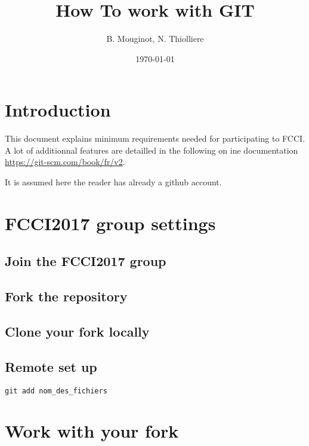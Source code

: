 \documentclass[a4paper,11pt]{article}
\title{How To work with GIT}
\date{\today}
\author{B. Mouginot, N. Thiolliere}
\begin{document}
\maketitle
{}

\tableofcontents

\section{Introduction}

	This document explains minimum requirements needed for participating to FCCI. A lot of additionnal features are detailled in the following on ine documentation \url{https://git-scm.com/book/fr/v2}.

	It is assumed here the reader has already a github account.

\section{FCCI2017 group settings}

	\subsection{Join the FCCI2017 group}

	\subsection{Fork the repository}

	\subsection{Clone your fork locally}

	\subsection{Remote set up}

	\begin{lstlisting}[style=BashInputStyle]
	git add nom_des_fichiers
	\end{lstlisting}
	\bigskip

\section{Work with your fork}
\end{document}
